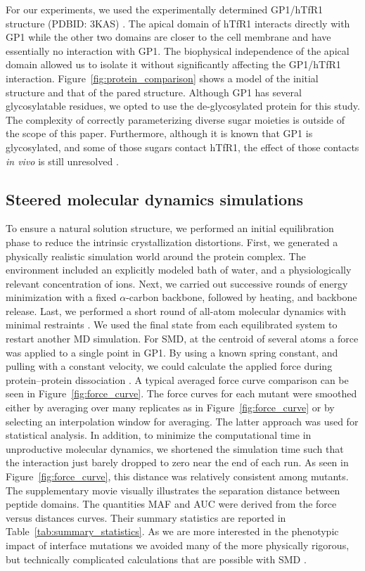 \documentclass[12pt]{article}
\begin{document}
For our experiments, we used the experimentally determined GP1/hTfR1 structure (PDBID: 3KAS) \citep{Abraham2010}. The apical domain of hTfR1 interacts directly with GP1 while the other two domains are closer to the cell membrane and have essentially no interaction with GP1. The biophysical independence of the apical domain allowed us to isolate it without significantly affecting the GP1/hTfR1 interaction. Figure~\ref{fig:protein_comparison} shows a model of the initial structure and that of the pared structure. Although GP1 has several glycosylatable residues, we opted to use the de-glycosylated protein for this study. The complexity of correctly parameterizing diverse sugar moieties is outside of the scope of this paper. Furthermore, although it is known that GP1 is glycosylated, and some of those sugars contact hTfR1, the effect of those contacts \textit{in vivo} is still unresolved \citep{Abraham2010}.

\subsection*{Steered molecular dynamics simulations}
To ensure a natural solution structure, we performed an initial equilibration phase to reduce the intrinsic crystallization distortions. First, we generated a physically realistic simulation world around the protein complex. The environment included an explicitly modeled bath of water, and a physiologically relevant concentration of ions. Next, we carried out successive rounds of energy minimization with a fixed $\alpha$-carbon backbone, followed by heating, and backbone release. Last, we performed a short round of all-atom molecular dynamics with minimal restraints \citep{Cuendet2008}. We used the final state from each equilibrated system to restart another MD simulation. For SMD, at the centroid of several atoms a force was applied to a single point in GP1. By using a known spring constant, and pulling with a constant velocity, we could calculate the applied force during protein--protein dissociation \citep{Cuendet2008,Cuendet2011}. A typical averaged force curve comparison can be seen in Figure~\ref{fig:force_curve}. The force curves for each mutant were smoothed either by averaging over many replicates as in Figure~\ref{fig:force_curve} or by selecting an interpolation window for averaging. The latter approach was used for statistical analysis. In addition, to minimize the computational time in unproductive molecular dynamics, we shortened the simulation time such that the interaction just barely dropped to zero near the end of each run. As seen in Figure~\ref{fig:force_curve}, this distance was relatively consistent among mutants. The supplementary movie visually illustrates the separation distance between peptide domains. The quantities MAF and AUC were derived from the force versus distances curves. Their summary statistics are reported in Table~\ref{tab:summary_statistics}. As we are more interested in the phenotypic impact of interface mutations we avoided many of the more physically rigorous, but technically complicated calculations that are possible with SMD \citep{Is2001A,Is2001B}.
\end{document}
